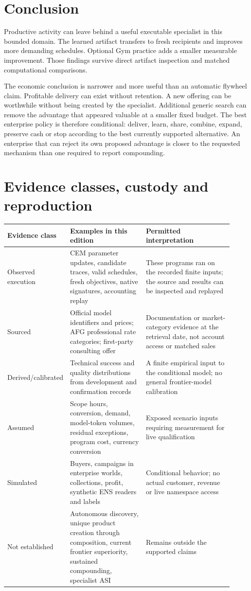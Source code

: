 \documentclass[11pt,letterpaper]{article}
\begin{document}
\section{Conclusion}

Productive activity can leave behind a useful executable specialist in this bounded domain. The learned artifact transfers to fresh recipients and improves more demanding schedules. Optional Gym practice adds a smaller measurable improvement. Those findings survive direct artifact inspection and matched computational comparisons.

The economic conclusion is narrower and more useful than an automatic flywheel claim. Profitable delivery can exist without retention. A new offering can be worthwhile without being created by the specialist. Additional generic search can remove the advantage that appeared valuable at a smaller fixed budget. The best enterprise policy is therefore conditional: deliver, learn, share, combine, expand, preserve cash or stop according to the best currently supported alternative. An enterprise that can reject its own proposed advantage is closer to the requested mechanism than one required to report compounding.

\clearpage
\appendix
\section{Evidence classes, custody and reproduction}

\begin{longtable}{L{0.19\linewidth}L{0.34\linewidth}L{0.39\linewidth}}
\toprule
Evidence class & Examples in this edition & Permitted interpretation\\
\midrule\endhead
Observed execution & CEM parameter updates, candidate traces, valid schedules, fresh objectives, native signatures, accounting replay & These programs ran on the recorded finite inputs; the source and results can be inspected and replayed\\
Sourced & Official model identifiers and prices; AFG professional rate categories; first-party consulting offer & Documentation or market-category evidence at the retrieval date, not account access or matched sales\\
Derived/calibrated & Technical success and quality distributions from development and confirmation records & A finite empirical input to the conditional model; no general frontier-model calibration\\
Assumed & Scope hours, conversion, demand, model-token volumes, residual exceptions, program cost, currency conversion & Exposed scenario inputs requiring measurement for live qualification\\
Simulated & Buyers, campaigns in enterprise worlds, collections, profit, synthetic ENS readers and labels & Conditional behavior; no actual customer, revenue or live namespace access\\
Not established & Autonomous discovery, unique product creation through composition, current frontier superiority, sustained compounding, specialist ASI & Remains outside the supported claims\\
\bottomrule
\end{longtable}
\end{document}
